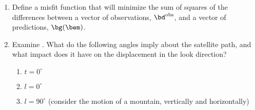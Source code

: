 \documentclass[11pt,titlepage,fleqn]{article}
\begin{document}
\begin{enumerate}
\vspace{1cm}

\item Define a misfit function that will minimize the sum of squares of the differences between a vector of observations, $\bd^{\rm obs}$, and a vector of predictions, $\bg(\bem)$. 

\vspace{1cm}

\item Examine . What do the following angles imply about the satellite path, and what impact does it have on the displacement in the look direction?

\renewcommand{\theenumi}{\Alph{enumi}}
\begin{enumerate}
\item $t=0^\circ$ \vspace{1cm}
\item $l = 0^\circ$ \vspace{1cm}
\item $l = 90^\circ$ (consider the motion of a mountain, vertically and horizontally) \vspace{1cm}
\end{enumerate}

\end{enumerate}

\pagebreak



\end{document}
